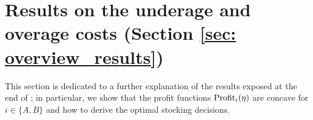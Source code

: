 \section{Results on the underage and overage costs (Section \ref{sec: overview_results})}
\label{appendix: underage-costs}
This section is dedicated to a further explanation of the results exposed at the end of ; in particular, we show that the profit functions $\text{Profit}_{i}(\eta)$ are concave for $i \in \{A,B\}$ and how to derive the optimal stocking decisions.

